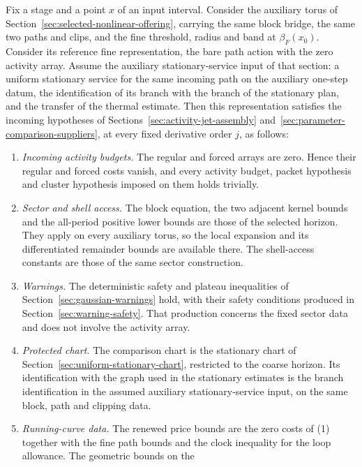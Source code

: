 \begin{lemma}
\label{lem:selected-chartlet-matching}
Fix a stage and a point $x$ of an input interval. Consider the auxiliary
torus of Section~\ref{sec:selected-nonlinear-offering}, carrying the
same block bridge, the same two paths and clips, and the fine threshold,
radius and band at $\beta_F(x_0)$. Consider its reference fine
representation, the bare path action with the zero activity array.
Assume the auxiliary stationary-service input of that section: a
uniform stationary service for the same incoming path on the auxiliary
one-step datum, the identification of its branch with the branch of the
stationary plan, and the transfer of the thermal estimate. Then this
representation satisfies the incoming hypotheses of
Sections~\ref{sec:activity-jet-assembly}
and~\ref{sec:parameter-comparison-suppliers}, at every fixed derivative
order $j$, as follows:
\begin{enumerate}
\item \emph{Incoming activity budgets.} The regular and forced arrays
  are zero. Hence their regular and forced costs vanish, and every
  activity budget, packet hypothesis and cluster hypothesis imposed on
  them holds trivially.
\item \emph{Sector and shell access.} The block equation, the two
  adjacent kernel bounds and the all-period positive lower bounds are
  those of the selected horizon. They apply on every auxiliary torus, so
  the local expansion and its differentiated remainder bounds are
  available there. The shell-access constants are those of the same
  sector construction.
\item \emph{Warnings.} The deterministic safety and plateau inequalities
  of Section~\ref{sec:gaussian-warnings} hold, with their safety
  conditions produced in Section~\ref{sec:warning-safety}. That
  production concerns the fixed sector data and does not involve the
  activity array.
\item \emph{Protected chart.} The comparison chart is the stationary
  chart of Section~\ref{sec:uniform-stationary-chart}, restricted to the
  coarse horizon. Its identification with the graph used in the
  stationary estimates is the branch identification in the assumed
  auxiliary stationary-service input, on the same block, path and
  clipping data.
\item \emph{Running-curve data.} The renewed price bounds are the zero
  costs of (1) together with the fine path bounds and the clock
  inequality for the loop allowance. The geometric bounds on the

\end{enumerate}
\end{lemma}
